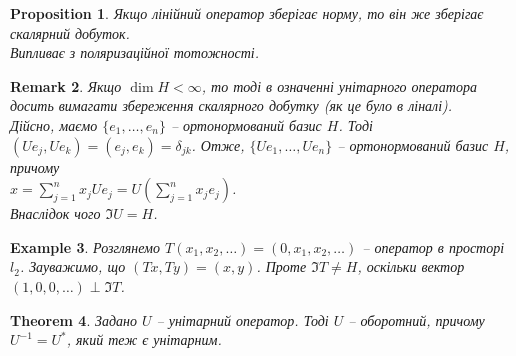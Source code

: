 \documentclass[a4paper, 10pt]{article}
\makeatletter
\theoremstyle{theoremdd}
\newtheorem{theorem}{Theorem}[subsection]
\theoremstyle{theoremdd}
\theoremstyle{theoremdd}
\theoremstyle{theoremdd}
\newtheorem{example}[theorem]{Example}
\theoremstyle{theoremdd}
\newtheorem{proposition}[theorem]{Proposition}
\theoremstyle{theoremdd}
\newtheorem{remark}[theorem]{Remark}
\theoremstyle{theoremdd}
\theoremstyle{theoremdd}
\renewenvironment{proof}[1][Proof.\\]{\par
\pushQED{\hfill \qed}%
\normalfont \topsep6\p@\@plus6\p@\relax
\trivlist
\item\relax
{\bfseries
#1\@addpunct{.}}\hspace\labelsep\ignorespaces
}{%
\popQED\endtrivlist\@endpefalse
}
\makeatother
\begin{document}
\begin{proposition}
Якщо лінійний оператор зберігає норму, то він же зберігає скалярний добуток.\\
\textit{Випливає з поляризаційної тотожності.}
\end{proposition}

\iffalse
\begin{proof}
Маємо оператор $A$ такий, що $\|Ax\| = \|x\|$. Покажемо, що $(Ax,Ay) = (x,y)$.\\
Із одного боку, маємо таку рівність:\\
$(A(x+y),A(x+y)) = (Ax + Ay, Ax + Ay) = (Ax,Ax) + (Ax,Ay) + (Ay,Ax) + (Ay,Ay) = \\ = (x,x) + (Ax,Ay) + (Ay,Ax) + (y,y)$.\\
Із іншого боку, маємо\\
$(A(x+y),A(x,y)) = (x+y,x+y) = (x,x) + (x,y) + (y,x) + (y,y)$.\\
$\implies (Ax,Ay) + (Ay,Ax) = (x,y) + (y,x)$, тобто $2 \Re (Ax,Ay) = 2 \Re (x,y) \implies \Re (Ax,Ay) = \Re (x,y)$.\\
Якщо розписати $(A(x+iy), A(x+iy))$ з двох боків, то так само доведемо, що $\Im (Ax,Ay) = \Im (x,y)$.\\
Таким чином, як комплексні числа, $(Ax,Ay) = (x,y)$.
\end{proof}
\fi

\begin{remark}
Якщо $\dim H < \infty$, то тоді в означенні унітарного оператора досить вимагати збереження скалярного добутку (як це було в ліналі).\\
Дійсно, маємо $\{e_1,\dots,e_n\}$ -- ортонормований базис $H$. Тоді $(Ue_j,Ue_k) = (e_j,e_k) = \delta_{jk}$. Отже, $\{Ue_1,\dots,Ue_n\}$ -- ортонормований базис $H$, причому\\
$x = \displaystyle\sum_{j=1}^n x_j Ue_j = U\left( \sum_{j=1}^n x_j e_j\right)$.\\
Внаслідок чого $\Im U = H$.
\end{remark}

\begin{example}
Розглянемо $T(x_1,x_2,\dots) = (0,x_1,x_2,\dots)$ -- оператор в просторі $l_2$. Зауважимо, що $(Tx,Ty) = (x,y)$. Проте $\Im T \neq H$, оскільки вектор $(1,0,0,\dots) \perp \Im T$.
\end{example}

\begin{theorem}
Задано $U$ -- унітарний оператор. Тоді $U$ -- оборотний, причому $U^{-1} = U^*$, який теж є унітарним.
\end{theorem}
\end{document}
